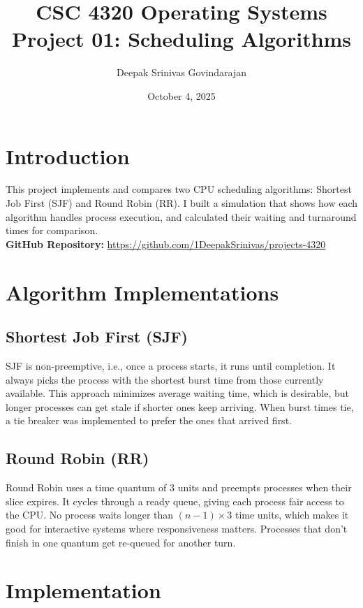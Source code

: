 \documentclass[12pt]{article}
\title{
    \textbf{CSC 4320 Operating Systems} \\
    \large Project 01: Scheduling Algorithms
}
\author{Deepak Srinivas Govindarajan}
\date{October 4, 2025}
\begin{document}
\maketitle
\thispagestyle{empty}

\section{Introduction}

This project implements and compares two CPU scheduling algorithms: Shortest Job First (SJF) and Round Robin (RR). I built a simulation that shows how each algorithm handles process execution, and calculated their waiting and turnaround times for comparison.\\
\textbf{GitHub Repository:} \url{https://github.com/1DeepakSrinivas/projects-4320}

\section{Algorithm Implementations}

\subsection{Shortest Job First (SJF)}

SJF is non-preemptive, i.e., once a process starts, it runs until completion. It always picks the process with the shortest burst time from those currently available. This approach minimizes average waiting time, which is desirable, but longer processes can get stale if shorter ones keep arriving. When burst times tie, a tie breaker was implemented to prefer the ones that arrived first.

\subsection{Round Robin (RR)}

Round Robin uses a time quantum of 3 units and preempts processes when their slice expires. It cycles through a ready queue, giving each process fair access to the CPU. No process waits longer than $(n-1) \times 3$ time units, which makes it good for interactive systems where responsiveness matters. Processes that don't finish in one quantum get re-queued for another turn.

\section{Implementation}
\end{document}
